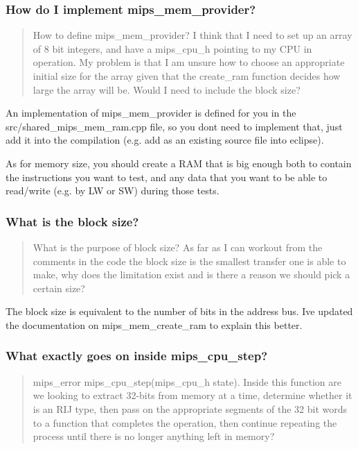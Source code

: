\subsubsection*{How do I implement mips\+\_\+mem\+\_\+provider?}

\begin{quote}
How to define mips\+\_\+mem\+\_\+provider? I think that I need to set up an array of 8 bit integers, and have a mips\+\_\+cpu\+\_\+h pointing to my C\+P\+U in operation. My problem is that I am unsure how to choose an appropriate initial size for the array given that the create\+\_\+ram function decides how large the array will be. Would I need to include the block size? \end{quote}


An implementation of mips\+\_\+mem\+\_\+provider is defined for you in the {\ttfamily src/shared\+\_\+mips\+\_\+mem\+\_\+ram.\+cpp} file, so you don\textquotesingle{}t need to implement that, just add it into the compilation (e.\+g. add as an existing source file into eclipse).

As for memory size, you should create a R\+A\+M that is big enough both to contain the instructions you want to test, and any data that you want to be able to read/write (e.\+g. by L\+W or S\+W) during those tests.

\subsubsection*{What is the block size?}

\begin{quote}
What is the purpose of block size? As far as I can workout from the comments in the code the block size is the smallest transfer one is able to make, why does the limitation exist and is there a reason we should pick a certain size? \end{quote}


The block size is equivalent to the number of bits in the address bus. I\textquotesingle{}ve updated the documentation on mips\+\_\+mem\+\_\+create\+\_\+ram to explain this better.

\subsubsection*{What exactly goes on inside mips\+\_\+cpu\+\_\+step?}

\begin{quote}
mips\+\_\+error mips\+\_\+cpu\+\_\+step(mips\+\_\+cpu\+\_\+h state). Inside this function are we looking to extract 32-\/bits from memory at a time, determine whether it is an R\+I\+J type, then pass on the appropriate segments of the 32 bit words to a function that completes the operation, then continue repeating the process until there is no longer anything left in memory? \end{quote}


